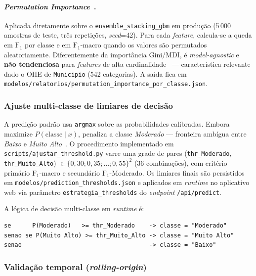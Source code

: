 \paragraph{\emph{Permutation Importance}~\cite{breiman2001random,fisher2019all}.} Aplicada diretamente sobre o \texttt{ensemble\_stacking\_gbm} em produção (5\,000 amostras de teste, três repetições, \emph{seed}=42). Para cada \emph{feature}, calcula-se a queda em \(\text{F}_1\) por classe e em \(\text{F}_1\)-macro quando os valores são permutados aleatoriamente. Diferentemente da importância Gini/MDI, é \emph{model-agnostic} e \textbf{não tendenciosa} para \emph{features} de alta cardinalidade~\cite{strobl2007bias} --- característica relevante dado o OHE de \texttt{Municipio} (542 categorias). A saída fica em \texttt{modelos/relatorios/permutation\_importance\_por\_classe.json}.

\subsubsection{Ajuste multi-classe de limiares de decisão}
\label{subsec:metod_thresholds}

A predição padrão usa \texttt{argmax} sobre as probabilidades calibradas. Embora maximize \(P(\text{classe} \mid x)\), penaliza a classe \emph{Moderado} --- fronteira ambígua entre \emph{Baixo} e \emph{Muito Alto}~\cite{he2009learning}. O procedimento implementado em \texttt{scripts/ajustar\_threshold.py} varre uma grade de pares (\texttt{thr\_Moderado}, \texttt{thr\_Muito\_Alto}) \(\in \{0{,}30; 0{,}35; \ldots; 0{,}55\}^2\) (36 combinações), com critério primário \(\text{F}_1\)-macro e secundário \(\text{F}_1\)-Moderado. Os limiares finais são persistidos em \texttt{modelos/prediction\_thresholds.json} e aplicados em \emph{runtime} no aplicativo web via parâmetro \texttt{estrategia\_thresholds} do \emph{endpoint} \texttt{/api/predict}.

A lógica de decisão multi-classe em \emph{runtime} é:

\begin{verbatim}
se      P(Moderado)   >= thr_Moderado    -> classe = "Moderado"
senao se P(Muito Alto) >= thr_Muito_Alto -> classe = "Muito Alto"
senao                                    -> classe = "Baixo"
\end{verbatim}

\subsubsection{Validação temporal (\emph{rolling-origin})}
\label{subsec:metod_validacao_temporal}

